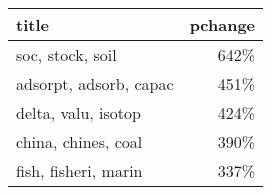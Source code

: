 \begin{tabular}{p{1.2cm}r}
\toprule
                  title &  pchange \\
\midrule
       soc, stock, soil &     642\% \\
 adsorpt, adsorb, capac &     451\% \\
    delta, valu, isotop &     424\% \\
    china, chines, coal &     390\% \\
   fish, fisheri, marin &     337\% \\
\bottomrule
\end{tabular}
